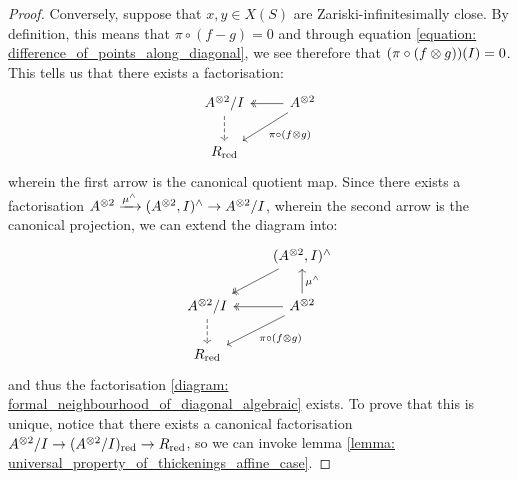 \begin{proof}
                Conversely, suppose that $x, y \in X(S)$ are Zariski-infinitesimally close. By definition, this means that $\pi \circ (f - g) = 0$ and through equation \eqref{equation: difference_of_points_along_diagonal}, we see therefore that $(\pi \circ (f \tensor g))(I) = 0$. This tells us that there exists a factorisation:
                    $$
                        \begin{tikzcd}
                    	{A^{\tensor 2}/I} & {A^{\tensor 2}} \\
                    	{R_{\red}}
                    	\arrow[dashed, from=1-1, to=2-1]
                    	\arrow[two heads, from=1-2, to=1-1]
                    	\arrow["{\pi \circ (f \tensor g)}", from=1-2, to=2-1]
                        \end{tikzcd}
                    $$
                wherein the first arrow is the canonical quotient map. Since there exists a factorisation $A^{\tensor 2} \xrightarrow[]{\mu^{\wedge}} (A^{\tensor 2}, I)^{\wedge} \to A^{\tensor 2}/I$, wherein the second arrow is the canonical projection, we can extend the diagram into:
                    $$
                        \begin{tikzcd}
                    	& {(A^{\tensor 2}, I)^{\wedge}} \\
                    	{A^{\tensor 2}/I} & {A^{\tensor 2}} \\
                    	{R_{\red}}
                    	\arrow[two heads, from=1-2, to=2-1]
                    	\arrow[dashed, from=2-1, to=3-1]
                    	\arrow["{\mu^{\wedge}}"', from=2-2, to=1-2]
                    	\arrow[two heads, from=2-2, to=2-1]
                    	\arrow["{\pi \circ (f \tensor g)}", from=2-2, to=3-1]
                        \end{tikzcd}
                    $$
                and thus the factorisation \eqref{diagram: formal_neighbourhood_of_diagonal_algebraic} exists. To prove that this is unique, notice that there exists a canonical factorisation $A^{\tensor 2}/I \to (A^{\tensor 2}/I)_{\red} \to R_{\red}$, so we can invoke lemma \ref{lemma: universal_property_of_thickenings_affine_case}.
            \end{proof}

